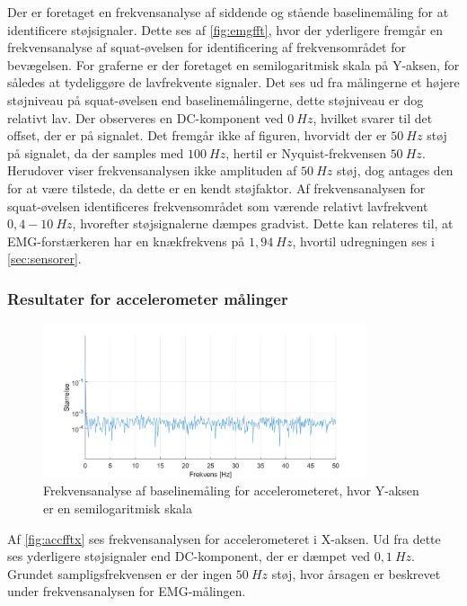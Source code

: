Der er foretaget en frekvensanalyse af siddende og stående baselinemåling for at identificere støjsignaler. Dette ses af \autoref{fig:emgfft}, hvor der yderligere fremgår en frekvensanalyse af squat-øvelsen for identificering af frekvensområdet for bevægelsen. For graferne er der foretaget en semilogaritmisk skala på Y-aksen, for således at tydeliggøre de lavfrekvente signaler. Det ses ud fra målingerne et højere støjniveau på squat-øvelsen end baselinemålingerne, dette støjniveau er dog relativt lav. 
Der observeres en DC-komponent ved $0~Hz$, hvilket svarer til det offset, der er på signalet. 
Det fremgår ikke af figuren, hvorvidt der er $50~Hz$ støj på signalet, da der samples med $100~Hz$, hertil er Nyquist-frekvensen $50~Hz$. Herudover viser frekvensanalysen ikke amplituden af $50~Hz$ støj, dog antages den for at være tilstede, da dette er en kendt støjfaktor. 
Af frekvensanalysen for squat-øvelsen identificeres frekvensområdet som værende relativt lavfrekvent $0,4-10~Hz$, hvorefter støjsignalerne dæmpes gradvist. Dette kan relateres til, at EMG-forstærkeren har en knækfrekvens på $1,94~Hz$, hvortil udregningen ses i \autoref{sec:sensorer}. 


\subsubsection{Resultater for accelerometer målinger} \label{sec:acc_fft}

\begin{figure}[H]
	\centering
	\includegraphics[width=0.85\textwidth]{figures/Pilotforsoeg/accfft.png}
	\caption{Frekvensanalyse af baselinemåling for accelerometeret, hvor Y-aksen er en semilogaritmisk skala}
	\label{fig:accfftx}
\end{figure}
Af \autoref{fig:accfftx} ses frekvensanalysen for accelerometeret i X-aksen. Ud fra dette ses yderligere støjsignaler end DC-komponent, der er dæmpet ved $0,1~Hz$. Grundet sampligsfrekvensen er der ingen $50~Hz$ støj, hvor årsagen er beskrevet under frekvensanalysen for EMG-målingen. 

